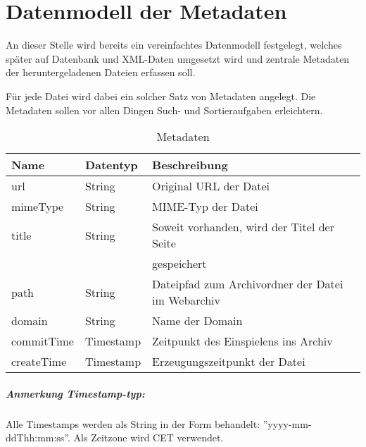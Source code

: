 \chapter{Datenmodell der Metadaten} \label{spec:model}
An dieser Stelle wird bereits ein vereinfachtes Datenmodell festgelegt, 
welches später auf Datenbank und XML-Daten umgesetzt wird und zentrale Metadaten 
der heruntergeladenen Dateien erfassen soll. 

Für jede Datei wird dabei ein solcher Satz von Metadaten angelegt.
Die Metadaten sollen vor allen Dingen Such- und Sortieraufgaben erleichtern. 

\begin{table}[h]
\centering
\begin{tabular}{|l|l|l|}	
	\hline
	Name 		& Datentyp 				& Beschreibung \\
	\hline
	url 		& String 				& Original URL der Datei\\
	\hline
	mimeType	& String 				& MIME-Typ der Datei\\
	\hline
	title 		& String 				& Soweit vorhanden, wird der Titel der Seite \\ 
	 			& 						& gespeichert \\ 
	\hline
	path 		& String 				& Dateipfad zum Archivordner der Datei im Webarchiv \\
	\hline
	domain 		& String 				& Name der Domain \\
	\hline
	commitTime 	& Timestamp 			& Zeitpunkt des Einspielens ins Archiv \\
	\hline
	createTime 	& Timestamp 			& Erzeugungszeitpunkt der Datei \\
	\hline
\end{tabular}
\caption{Metadaten}
\end{table}

\paragraph{Anmerkung Timestamp-typ:}
Alle Timestamps werden als String in der Form behandelt:
''yyyy-mm-ddThh:mm:ss''. Als Zeitzone wird CET verwendet.

